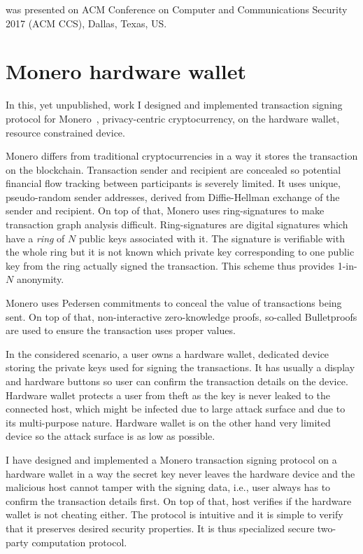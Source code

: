 \documentclass[
  digital, %
  twoside, %
  table,   %
  lof,     %
  lot,     %
]{fithesis3}
\theoremstyle{definition}
\theoremstyle{remark}
\begin{document}
\cite{2017-ccs-mavroudis} was presented on ACM Conference on Computer and Communications Security 2017 (ACM CCS), Dallas, Texas, US.

\section{Monero hardware wallet}\label{sec:res:monero}
\label{sec:aim:monero_hw_wallet}
In this, yet unpublished, work I designed and implemented transaction signing protocol for Monero~\cite{zero_to_monero}, privacy-centric cryptocurrency, on the hardware wallet, resource constrained device. 

Monero differs from traditional cryptocurrencies in a way it stores the transaction on the blockchain. Transaction sender and recipient are concealed so potential financial flow tracking between participants is severely limited. It uses unique, pseudo-random sender addresses, derived from Diffie-Hellman exchange of the sender and recipient. On top of that, Monero uses ring-signatures to make transaction graph analysis difficult. Ring-signatures are digital signatures which have a \emph{ring} of $N$ public keys associated with it. The signature is verifiable with the whole ring but it is not known which private key corresponding to one public key from the ring actually signed the transaction. This scheme thus provides 1-in-$N$ anonymity.

Monero uses Pedersen commitments to conceal the value of transactions being sent. On top of that, non-interactive zero-knowledge proofs, so-called Bulletproofs \cite{Bnz2017BulletproofsSP} are used to ensure the transaction uses proper values.

In the considered scenario, a user owns a hardware wallet, dedicated device storing the private keys used for signing the transactions. It has usually a display and hardware buttons so user can confirm the transaction details on the device. Hardware wallet protects a user from theft as the key is never leaked to the connected host, which might be infected due to large attack surface and due to its multi-purpose nature. Hardware wallet is on the other hand very limited device so the attack surface is as low as possible. 

I have designed and implemented a Monero transaction signing protocol on a hardware wallet in a way the secret key never leaves the hardware device and the malicious host cannot tamper with the signing data, i.e., user always has to confirm the transaction details first. On top of that, host verifies if the hardware wallet is not cheating either. The protocol is intuitive and it is simple to verify that it preserves desired security properties. It is thus specialized secure two-party computation protocol. 
\end{document}
